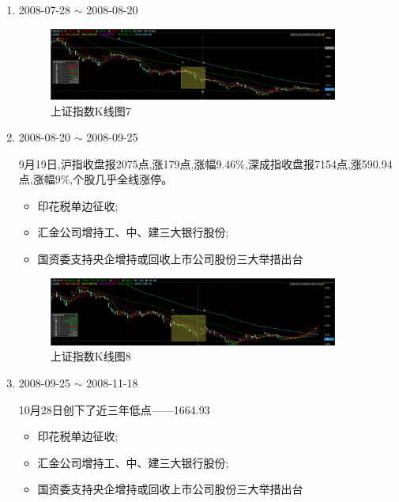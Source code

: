 \documentclass[12pt,a4paper]{article}
\begin{document}
\begin{enumerate}[1)]
\item 2008-07-28 $\sim$ 2008-08-20

	\begin{figure}[H]
		\centering
		\includegraphics[width=0.9\textwidth]{img/17.png}%
		\caption{上证指数K线图7}
	\end{figure}
	
\item 2008-08-20 $\sim$ 2008-09-25

9月19日,沪指收盘报2075点,涨179点,涨幅9.46\%,深成指收盘报7154点,涨590.94点,涨幅9\%,个股几乎全线涨停。
	\begin{itemize}
	\item 印花税单边征收;
	\item 汇金公司增持工、中、建三大银行股份;
	\item 国资委支持央企增持或回收上市公司股份三大举措出台
	
	\end{itemize}

	\begin{figure}[H]
		\centering
		\includegraphics[width=0.9\textwidth]{img/18.png}%
		\caption{上证指数K线图8}
	\end{figure}	

\item 2008-09-25 $\sim$ 2008-11-18

10月28日创下了近三年低点——1664.93

	\begin{itemize}
	\item 印花税单边征收;
	\item 汇金公司增持工、中、建三大银行股份;
	\item 国资委支持央企增持或回收上市公司股份三大举措出台
	
	\end{itemize}


\end{enumerate}
\end{document}
